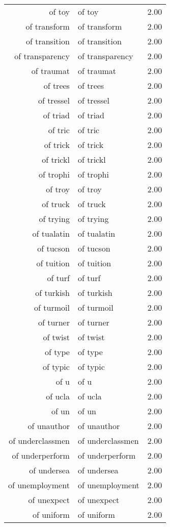 \begin{table}[ht]
\begin{tabular}{rlr}
  of toy & of toy & 2.00 \\ 
  of transform & of transform & 2.00 \\ 
  of transition & of transition & 2.00 \\ 
  of transparency & of transparency & 2.00 \\ 
  of traumat & of traumat & 2.00 \\ 
  of trees & of trees & 2.00 \\ 
  of tressel & of tressel & 2.00 \\ 
  of triad & of triad & 2.00 \\ 
  of tric & of tric & 2.00 \\ 
  of trick & of trick & 2.00 \\ 
  of trickl & of trickl & 2.00 \\ 
  of trophi & of trophi & 2.00 \\ 
  of troy & of troy & 2.00 \\ 
  of truck & of truck & 2.00 \\ 
  of trying & of trying & 2.00 \\ 
  of tualatin & of tualatin & 2.00 \\ 
  of tucson & of tucson & 2.00 \\ 
  of tuition & of tuition & 2.00 \\ 
  of turf & of turf & 2.00 \\ 
  of turkish & of turkish & 2.00 \\ 
  of turmoil & of turmoil & 2.00 \\ 
  of turner & of turner & 2.00 \\ 
  of twist & of twist & 2.00 \\ 
  of type & of type & 2.00 \\ 
  of typic & of typic & 2.00 \\ 
  of u & of u & 2.00 \\ 
  of ucla & of ucla & 2.00 \\ 
  of un & of un & 2.00 \\ 
  of unauthor & of unauthor & 2.00 \\ 
  of underclassmen & of underclassmen & 2.00 \\ 
  of underperform & of underperform & 2.00 \\ 
  of undersea & of undersea & 2.00 \\ 
  of unemployment & of unemployment & 2.00 \\ 
  of unexpect & of unexpect & 2.00 \\ 
  of uniform & of uniform & 2.00 \\ 

\end{tabular}
\end{table}
